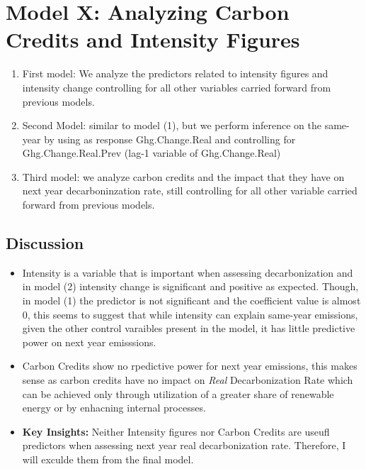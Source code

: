 \section{Model X: Analyzing Carbon Credits and Intensity Figures}

\begin{enumerate}
    \item First model: We analyze the predictors related to intensity figures and intensity change controlling for all other variables carried forward from previous models.
    \item Second Model: similar to model (1), but we perform inference on the same-year by using as response Ghg.Change.Real and controlling for Ghg.Change.Real.Prev (lag-1 variable of Ghg.Change.Real)
    \item Third model: we analyze carbon credits and the impact that they have on next year decarboninzation rate, still controlling for all other variable carried forward from previous models.
\end{enumerate}



\subsection{Discussion}

\begin{itemize}
    \item Intensity is a variable that is important when assessing decarbonization and in model (2) intensity change is significant and positive as expected. Though, in model (1) the predictor is not significant and the coefficient value is almost $0$, this seems to suggest that while intensity can explain same-year emissions, given the other control varaibles present in the model, it has little predictive power on next year emisssions.
    \item Carbon Credits show no rpedictive power for next year emissions, this makes sense as carbon credits have no impact on \textit{Real} Decarbonization Rate which can be achieved only through utilization of a greater share of renewable energy or by enhacning internal processes.
    \item \textbf{Key Insights: } Neither Intensity figures nor Carbon Credits are useufl predictors when assessing next year real decarbonization rate. Therefore, I will exculde them from the final model.
\end{itemize}


